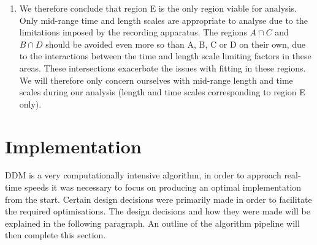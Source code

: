 \documentclass[11pt]{article}
\begin{document}
\begin{enumerate}[label=(\Alph*)]
\item We therefore conclude that region E is the only region viable for analysis. Only mid-range time and length scales are appropriate to analyse due to the limitations imposed by the recording apparatus. The regions $A \cap C$ and $B \cap D$ should be avoided even more so than A, B, C or D on their own, due to the interactions between the time and length scale limiting factors in these areas. These intersections exacerbate the issues with fitting in these regions. We will therefore only concern ourselves with mid-range length and time scales during our analysis (length and time scales corresponding to region E only).
\end{enumerate}


\section{Implementation}

DDM is a very computationally intensive algorithm, in order to approach real-time speeds it was necessary to focus on producing an optimal implementation from the start. Certain design decisions were primarily made in order to facilitate the required optimisations. The design decisions and how they were made will be explained in the following paragraph. An outline of the algorithm pipeline will then complete this section.
\\\\
\end{document}
